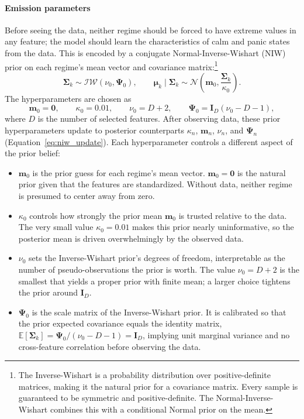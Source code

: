 \paragraph{Emission parameters}
Before seeing the data, neither regime should be forced to have extreme values in any feature; the model should learn the characteristics of calm and panic states from the data. This is encoded by a conjugate Normal-Inverse-Wishart (NIW) prior on each regime's mean vector and covariance matrix:\footnote{The Inverse-Wishart is a probability distribution over positive-definite matrices, making it the natural prior for a covariance matrix. Every sample is guaranteed to be symmetric and positive-definite. The Normal-Inverse-Wishart combines this with a conditional Normal prior on the mean.}
\begin{equation}
\boldsymbol{\Sigma}_k \sim \mathcal{IW}(\nu_0,\boldsymbol{\Psi}_0),
\qquad
\boldsymbol{\mu}_k \mid \boldsymbol{\Sigma}_k
\sim
\mathcal{N}\!\left(\mathbf{m}_0,\frac{\boldsymbol{\Sigma}_k}{\kappa_0}\right).
\end{equation}
The hyperparameters are chosen as
\begin{equation}\label{eq:niw_hyperparams}
\mathbf{m}_0 = \mathbf{0},\qquad
\kappa_0 = 0.01,\qquad
\nu_0 = D+2,\qquad
\boldsymbol{\Psi}_0 = \mathbf{I}_D(\nu_0-D-1),
\end{equation}
where $D$ is the number of selected features. After observing data, these prior hyperparameters update to posterior counterparts $\kappa_n$, $\mathbf{m}_n$, $\nu_n$, and $\boldsymbol{\Psi}_n$ (Equation~\ref{eq:niw_update}). Each hyperparameter controls a different aspect of the prior belief:
\begin{itemize}
    \item $\mathbf{m}_0$ is the prior guess for each regime's mean vector. $\mathbf{m}_0 = \mathbf{0}$ is the natural prior given that the features are standardized. Without data, neither regime is presumed to center away from zero.
    \item $\kappa_0$ controls how strongly the prior mean $\mathbf{m}_0$ is trusted relative to the data. The very small value $\kappa_0 = 0.01$ makes this prior nearly uninformative, so the posterior mean is driven overwhelmingly by the observed data.
    \item $\nu_0$ sets the Inverse-Wishart prior's degrees of freedom, interpretable as the number of pseudo-observations the prior is worth. The value $\nu_0 = D + 2$ is the smallest that yields a proper prior with finite mean; a larger choice tightens the prior around $\mathbf{I}_D$.
    \item $\boldsymbol{\Psi}_0$ is the scale matrix of the Inverse-Wishart prior. It is calibrated so that the prior expected covariance equals the identity matrix, $\mathbb{E}[\boldsymbol{\Sigma}_k] = \boldsymbol{\Psi}_0 / (\nu_0 - D - 1) = \mathbf{I}_D$, implying unit marginal variance and no cross-feature correlation before observing the data.
\end{itemize}

